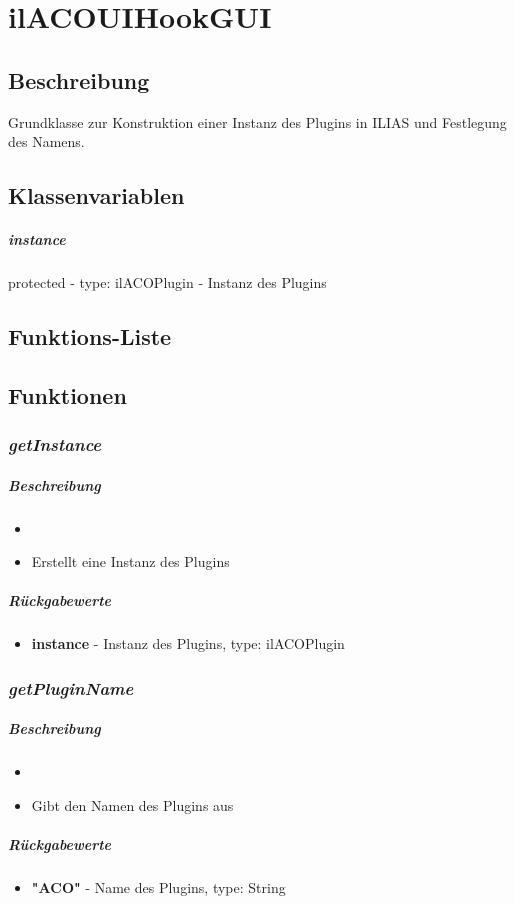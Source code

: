 \section{ilACOUIHookGUI}

\subsection*{Beschreibung}
Grundklasse zur Konstruktion einer Instanz des Plugins in ILIAS und Festlegung des Namens.

\subsection*{Klassenvariablen}
\subparagraph{instance}
protected - type: ilACOPlugin - Instanz des Plugins

\subsection*{Funktions-Liste}
\paragraph{}
\paragraph{}

\subsection*{Funktionen}
\subsubsection*{\textit{getInstance}}\label{getInstanceUIHGUI}
\subparagraph{Beschreibung}
\begin{itemize}
	\item[] \noindent{} 
	\item[] Erstellt eine Instanz des Plugins
\end{itemize}
\subparagraph{Rückgabewerte}
\begin{itemize}
	\item[] \textbf{instance} - Instanz des Plugins, type: ilACOPlugin
\end{itemize}

\subsubsection*{\textit{getPluginName}}\label{getPluginNameUIHGUI}
\subparagraph{Beschreibung}
\begin{itemize}
	\item[] \noindent{} 
	\item[] Gibt den Namen des Plugins aus
\end{itemize}
\subparagraph{Rückgabewerte}
\begin{itemize}
	\item[] \textbf{"ACO"} - Name des Plugins, type: String
\end{itemize}